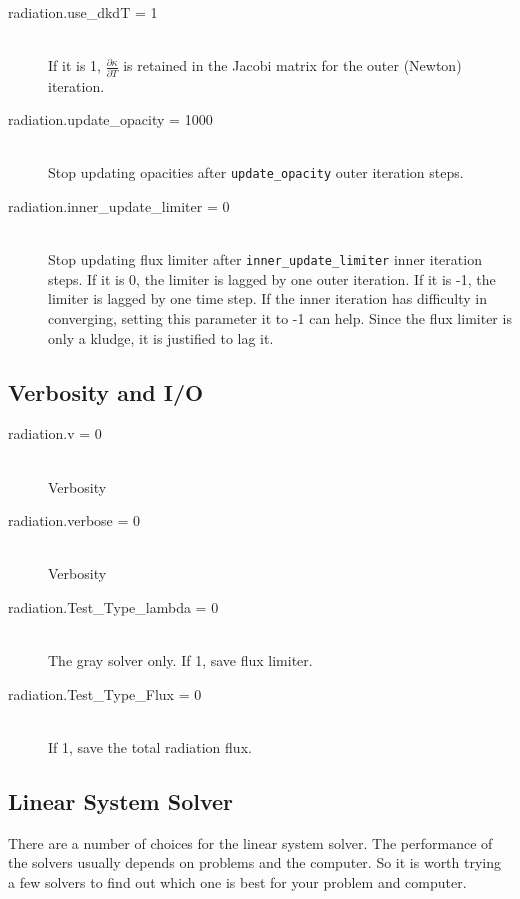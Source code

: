 \documentclass[11pt,letterpaper]{article}
\begin{document}
\begin{description}
\item[radiation.use\_dkdT = 1] \hfill \\
  If it is 1, $\frac{\partial \kappa}{\partial T}$ is retained in the
  Jacobi matrix for the outer (Newton) iteration.  
\item[radiation.update\_opacity = 1000] \hfill \\
  Stop updating opacities after {\tt update\_opacity} outer iteration steps.
\item[radiation.inner\_update\_limiter = 0] \hfill \\
  Stop updating flux limiter after {\tt inner\_update\_limiter} inner
  iteration steps.  If it is 0, the limiter is lagged by one outer
  iteration.  If it is -1, the limiter is lagged by one time step.  If
  the inner iteration has difficulty in converging, setting this
  parameter it to -1 can help.  Since the flux limiter is only a
  kludge, it is justified to lag it. 
\end{description}

\subsection{Verbosity and I/O}
\label{sec:bothpar}

\begin{description}
\item[radiation.v = 0] \hfill \\
  Verbosity
\item[radiation.verbose = 0] \hfill \\
  Verbosity
\item[radiation.Test\_Type\_lambda = 0] \hfill \\
  The gray solver only.  If 1, save flux limiter.
\item[radiation.Test\_Type\_Flux = 0] \hfill \\
  If 1, save the total radiation flux. 
\end{description}

\subsection{Linear System Solver}
\label{sec:hypre}

There are a number of choices for the linear system solver.  The
performance of the solvers usually depends on problems and the
computer.  So it is worth trying a few solvers to find out which one
is best for your problem and computer.
\end{document}
